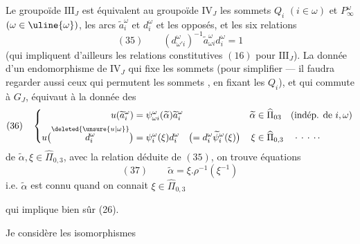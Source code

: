 Le groupoïde $\mathrm{III}_J$ est équivalent au groupoïde $\mathrm{IV}_J$   les sommets $Q_i$ $(i\in\omega)$ et $P_\infty^\omega$ $(\omega\in\uline{\omega})$, les arcs $\widetilde a_i^\omega$ et $d_i^\omega$ et les  opposés, et les six relations
\[
(35)\qquad(d_{\omega'i}^\omega)^{-1}\widetilde a_{\omega i}^{\omega}d_i^\omega=1
\]
(qui impliquent d'ailleurs les relations constitutives $(16)$ pour $\mathrm{III}_J$). La donnée d'un endomorphisme de $\mathrm{IV}_J$ qui fixe les  sommets (pour simplifier --- il faudra regarder aussi ceux qui permutent les sommets , en fixant les $Q_i$),  et qui commute à $G_J$, équivaut à la donnée des
\[
(36)\quad\left\{\begin{aligned}
u(\widetilde a_i^\omega)&=\psi_{\omega i}^\omega(\widetilde\alpha)\widetilde a_i^\omega
&\widetilde\alpha&\in\widehat\Pi_{03}\quad\text{(indép. de }i,\omega\text{)}\\
u\bigl(\overset{\deleted{\unsure{u|\omega}}}{d_i^\omega}\bigr)&=\psi_i^\omega(\xi)d_i^\omega\quad\bigl(=d_i^\omega\widetilde\psi_i^\omega(\xi)\bigr)
&\xi&\in\widehat\Pi_{0,3}\quad\cdot\,\cdot\,\cdot\,\cdot\,\cdot
\end{aligned}\right.
\]
de $\widetilde\alpha,\xi\in\widehat\Pi_{0,3}$, avec la relation déduite de $(35)$, on trouve  équations
\[
(37)\qquad\widetilde\alpha=\xi.\rho^{-1}(\xi^{-1})
\]
i.e. $\widetilde\alpha$ est connu quand on connait $\xi\in\widehat\Pi_{0,3}$

qui implique bien sûr (26).

Je  considère les isomorphismes

